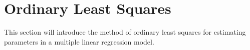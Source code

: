 \section{Ordinary Least Squares}
This section will introduce the method of ordinary least squares for estimating parameters in a multiple linear regression model.




